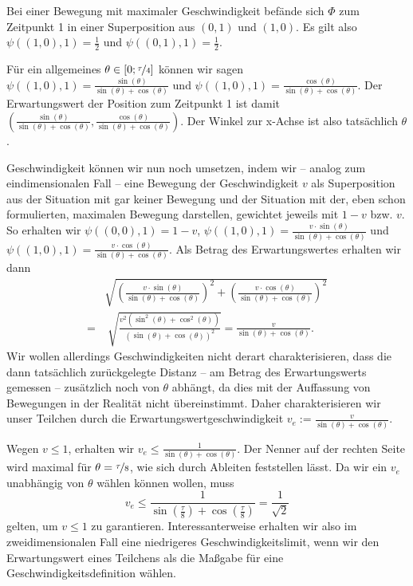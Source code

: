 \documentclass[a4paper,12pt,ngerman]{scrartcl}
\theoremstyle{plain}
\theoremstyle{plain}
\theoremstyle{plain}
\theoremstyle{plain}
\begin{document}
Bei einer Bewegung mit maximaler Geschwindigkeit befände sich $\Phi$ zum Zeitpunkt 1 in einer Superposition aus $(0,1)$ und $(1,0)$. Es gilt also $\psi((1,0),1)=\frac{1}{2}$ und $\psi((0,1),1)=\frac{1}{2}$.

Für ein allgemeines $\theta\in[0;\nicefrac{\tau}{4}]$ können wir sagen $\psi((1,0),1)=\frac{\sin(\theta)}{\sin(\theta)+\cos(\theta)}$ und $\psi((1,0),1)=\frac{\cos(\theta)}{\sin(\theta)+\cos(\theta)}$. Der Erwartungswert der Position zum Zeitpunkt 1 ist damit 
$\left(\frac{\sin(\theta)}{\sin(\theta)+\cos(\theta)},\frac{\cos(\theta)}{\sin(\theta)+\cos(\theta)}\right)$. Der Winkel zur x-Achse ist also tatsächlich $\theta$. 

Geschwindigkeit können wir nun noch umsetzen, indem wir -- analog zum eindimensionalen Fall -- eine Bewegung der Geschwindigkeit $v$ als Superposition aus der Situation mit gar keiner Bewegung und der Situation mit der, eben schon formulierten, maximalen Bewegung darstellen, gewichtet jeweils mit $1-v$ bzw. $v$. So erhalten wir $\psi((0,0),1)=1-v$,\; $\psi((1,0),1)=\frac{v\cdot\sin(\theta)}{\sin(\theta)+\cos(\theta)}$ und $\psi((1,0),1)=\frac{v\cdot\cos(\theta)}{\sin(\theta)+\cos(\theta)}$. Als Betrag des Erwartungswertes erhalten wir dann
\begin{align*}
&\sqrt{\left(\frac{v\cdot\sin(\theta)}{\sin(\theta)+\cos(\theta)}\right)^2+\left(\frac{v\cdot\cos(\theta)}{\sin(\theta)+\cos(\theta)}\right)^2}\\
=&\;\sqrt{\frac{v^2(\sin^2(\theta)+\cos^2(\theta))}{(\sin(\theta)+\cos(\theta))^2}}=\frac{v}{\sin(\theta)+\cos(\theta)}.
\end{align*}
Wir wollen allerdings Geschwindigkeiten nicht derart charakterisieren, dass die dann tatsächlich zurückgelegte Distanz -- am Betrag des Erwartungswerts gemessen -- zusätzlich noch von $\theta$ abhängt, da dies mit der Auffassung von Bewegungen in der Realität nicht übereinstimmt. Daher charakterisieren wir unser Teilchen durch die 
Erwartungswertgeschwindigkeit $v_e:=\frac{v}{\sin(\theta)+\cos(\theta)}.$ 

Wegen $v\leq1$, erhalten wir $v_e\leq\frac{1}{\sin(\theta)+\cos(\theta)}$. Der Nenner auf der rechten Seite wird maximal für $\theta=\nicefrac{\tau}{8}$, wie sich durch Ableiten feststellen lässt. Da wir ein $v_e$ unabhängig von $\theta$ wählen können wollen, muss 
\[v_e\leq\frac{1}{\sin\left(\frac{\tau}{8}\right)+\cos\left(\frac{\tau}{8}\right)}=\frac{1}{\sqrt{2}}\]
gelten, um $v\leq1$ zu garantieren. Interessanterweise erhalten wir also im zweidimensionalen Fall eine niedrigeres Geschwindigkeitslimit, wenn wir den Erwartungswert eines Teilchens als die Maßgabe für eine Geschwindigkeitsdefinition wählen. 
\end{document}
